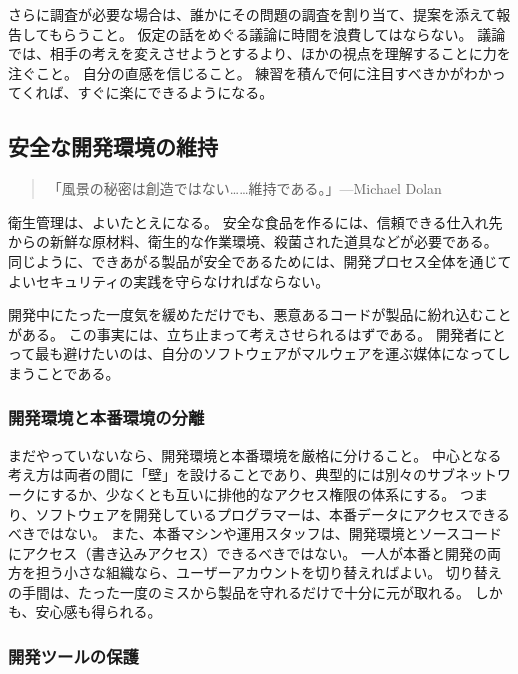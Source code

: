 \documentclass[uplatex]{jsarticle}
\begin{document}
さらに調査が必要な場合は、誰かにその問題の調査を割り当て、提案を添えて報告してもらうこと。
仮定の話をめぐる議論に時間を浪費してはならない。
議論では、相手の考えを変えさせようとするより、ほかの視点を理解することに力を注ぐこと。
自分の直感を信じること。
練習を積んで何に注目すべきかがわかってくれば、すぐに楽にできるようになる。

\subsection{安全な開発環境の維持}

\begin{quote}
「風景の秘密は創造ではない……維持である。」---Michael Dolan
\end{quote}

衛生管理は、よいたとえになる。
安全な食品を作るには、信頼できる仕入れ先からの新鮮な原材料、衛生的な作業環境、殺菌された道具などが必要である。
同じように、できあがる製品が安全であるためには、開発プロセス全体を通じてよいセキュリティの実践を守らなければならない。

開発中にたった一度気を緩めただけでも、悪意あるコードが製品に紛れ込むことがある。
この事実には、立ち止まって考えさせられるはずである。
開発者にとって最も避けたいのは、自分のソフトウェアがマルウェアを運ぶ媒体になってしまうことである。

\subsubsection{開発環境と本番環境の分離}

まだやっていないなら、開発環境と本番環境を厳格に分けること。
中心となる考え方は両者の間に「壁」を設けることであり、典型的には別々のサブネットワークにするか、少なくとも互いに排他的なアクセス権限の体系にする。
つまり、ソフトウェアを開発しているプログラマーは、本番データにアクセスできるべきではない。
また、本番マシンや運用スタッフは、開発環境とソースコードにアクセス（書き込みアクセス）できるべきではない。
一人が本番と開発の両方を担う小さな組織なら、ユーザーアカウントを切り替えればよい。
切り替えの手間は、たった一度のミスから製品を守れるだけで十分に元が取れる。
しかも、安心感も得られる。

\subsubsection{開発ツールの保護}
\end{document}
